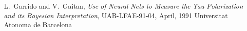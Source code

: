 \documentclass[a4paper]{jpconf}
\begin{document}
\begin{thebibliography}{9}
 L.~Garrido and V.~Gaitan, 
\emph{Use of Neural Nets to Measure the Tau Polarization and its Bayesian Interpretation},
UAB-LFAE-91-04, April, 1991 Universitat Atonoma de Barcelona


\end{thebibliography}
\end{document}
